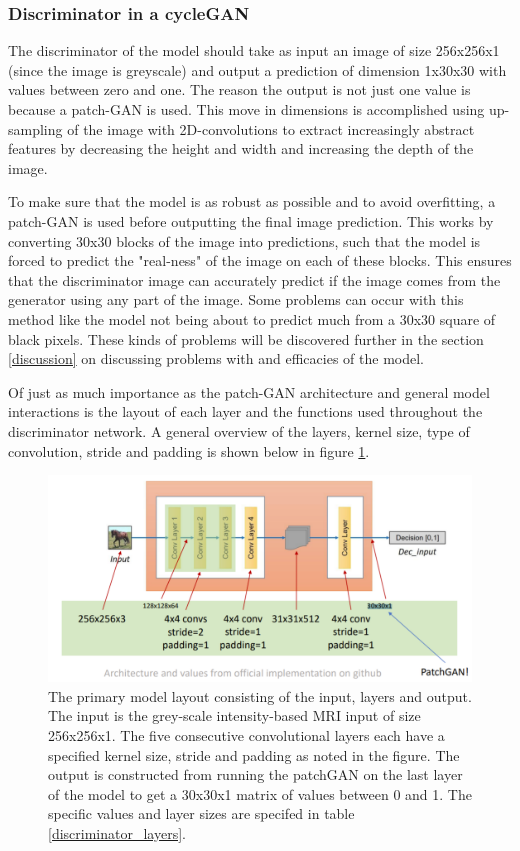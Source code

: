 \documentclass[12pt, fleqn, titlepage]{article}
\begin{document}
\subsubsection{Discriminator in a cycleGAN}
The discriminator of the model should take as input an image of size 256x256x1 (since the image is greyscale) and output a prediction of dimension 1x30x30 with values between zero and one. The reason the output is not just one value is because a patch-GAN is used. This move in dimensions is accomplished using up-sampling of the image with 2D-convolutions to extract increasingly abstract features by decreasing the height and width and increasing the depth of the image.

To make sure that the model is as robust as possible and to avoid overfitting, a patch-GAN is used before outputting the final image prediction. This works by converting 30x30 blocks of the image into predictions, such that the model is forced to predict the "real-ness" of the image on each of these blocks. This ensures that the discriminator image can accurately predict if the image comes from the generator using any part of the image. Some problems can occur with this method like the model not being about to predict much from a 30x30 square of black pixels. These kinds of problems will be discovered further in the section \ref{discussion} on discussing problems with and efficacies of the model.

Of just as much importance as the patch-GAN architecture and general model interactions is the layout of each layer and the functions used throughout the discriminator network. A general overview of the layers, kernel size, type of convolution, stride and padding is shown below in figure \ref{fig:cyclegandiscriminatorlayers}.
\begin{figure}[H]
	\centering
	\includegraphics[width=0.7\linewidth]{imgs/cyclegan_discriminator_layers}
	\caption{The primary model layout consisting of the input, layers and output. The input is the grey-scale intensity-based MRI input of size 256x256x1. The five consecutive convolutional layers each have a specified kernel size, stride and padding as noted in the figure. The output is constructed from running the patchGAN on the last layer of the model to get a 30x30x1 matrix of values between 0 and 1. The specific values and layer sizes are specifed in table \ref{discriminator_layers}.} %
	\label{fig:cyclegandiscriminatorlayers}
\end{figure}
\end{document}
